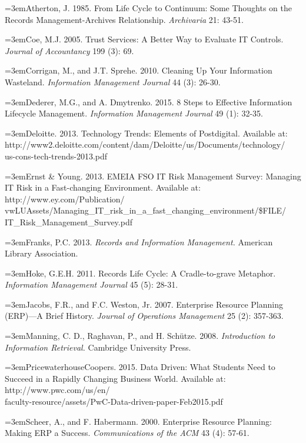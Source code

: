 \documentclass[12pt]{article}
\newcommand{\Reference}[1]{\parindent=0pt\hangindent=3em\hangafter=1#1\vspace{.15in}}
\begin{document}
\Reference{Atherton, J. 1985. From Life Cycle to Continuum: Some Thoughts on the Records Management-Archives Relationship. \emph{Archivaria} 21: 43-51.}

\Reference{Coe, M.J. 2005. Trust Services: A Better Way to Evaluate IT Controls. \emph{Journal of Accountancy} 199 (3): 69.}

\Reference{Corrigan, M., and J.T. Sprehe. 2010. Cleaning Up Your Information Wasteland. \emph{Information Management Journal} 44 (3): 26-30.}

\Reference{Dederer, M.G., and A. Dmytrenko. 2015. 8 Steps to Effective Information Lifecycle Management. \emph{Information Management Journal} 49 (1): 32-35.}

\Reference{Deloitte. 2013. Technology Trends: Elements of Postdigital. Available at:\\http://www2.deloitte.com/content/dam/Deloitte/us/Documents/technology/\\us-cons-tech-trends-2013.pdf}

\Reference{Ernst \& Young. 2013. EMEIA FSO IT Risk Management Survey: Managing IT Risk in a Fast-changing Environment. Available at: http://www.ey.com/Publication/\\vwLUAssets/Managing\_IT\_risk\_in\_a\_fast\_changing\_environment/\$FILE/\\IT\_Risk\_Management\_Survey.pdf}

\Reference{Franks, P.C. 2013. \emph{Records and Information Management.} American Library Association.}

\Reference{Hoke, G.E.H. 2011. Records Life Cycle: A Cradle-to-grave Metaphor. \emph{Information Management Journal} 45 (5): 28-31.}

\Reference{Jacobs, F.R., and F.C. Weston, Jr. 2007. Enterprise Resource Planning (ERP)---A Brief History. \emph{Journal of Operations Management} 25 (2): 357-363.}

\Reference{Manning, C. D., Raghavan, P., and H. Sch\"utze. 2008. \emph{Introduction to Information Retrieval.} Cambridge University Press.}

\Reference{PricewaterhouseCoopers. 2015. Data Driven: What Students Need to Succeed in a Rapidly Changing Business World. Available at: http://www.pwc.com/us/en/\\faculty-resource/assets/PwC-Data-driven-paper-Feb2015.pdf}

\Reference{Scheer, A., and F. Habermann. 2000. Enterprise Resource Planning: Making ERP a Success. \emph{Communications of the ACM} 43 (4): 57-61.}
\end{document}
